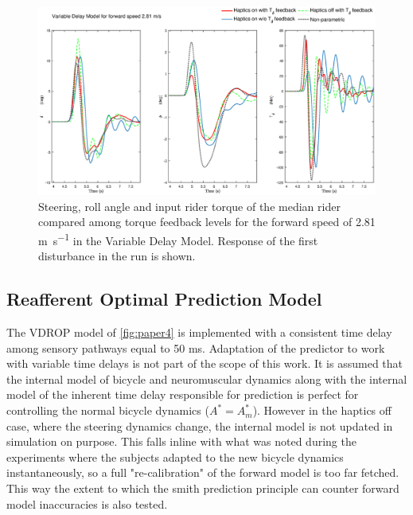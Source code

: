 \begin{figure}[!h]
    \centering
    \captionsetup{justification=centering,margin=2cm}

    \includegraphics[width=\textwidth]{images/fb_compare_plots/delay_fb_compare28.eps}
    \caption{Steering, roll angle and input rider torque of the median rider compared among torque feedback levels  for the forward speed of 2.81 \si{\meter\per\second} in the Variable Delay Model. Response of the first disturbance in the run is shown.}
    \label{fig:paper8}
\end{figure}


\subsection{Reafferent Optimal Prediction  Model}

The VDROP model of  \cref{fig:paper4} is implemented with a consistent time delay among sensory pathways equal to 50 \si{\milli\second}. Adaptation of the predictor to work with variable time delays is not part of the scope of this work. It is assumed that the internal model of bicycle and neuromuscular dynamics along with the internal model of the inherent time delay responsible for prediction is perfect for controlling the normal bicycle dynamics (\ensuremath{A^*=A_m^*}). However in the haptics off case, where the steering dynamics change, the internal model is not updated in simulation on purpose. This falls inline with what was noted during the experiments where the subjects adapted to the new bicycle dynamics instantaneously, so a full "re-calibration" of the forward model is too far fetched. This way the extent to which the smith prediction principle can counter forward model inaccuracies is also tested. 


